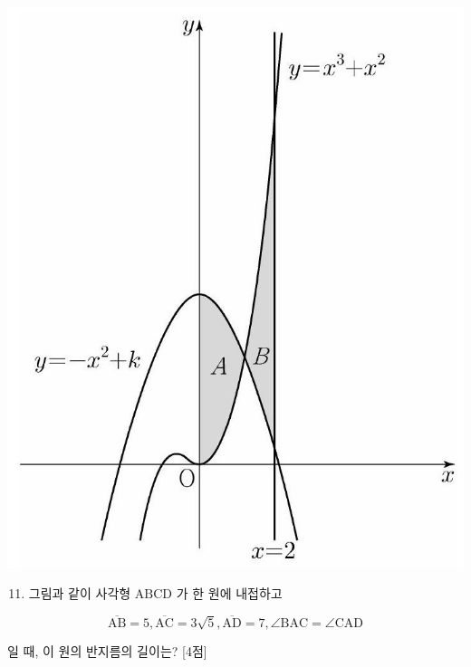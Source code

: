 \documentclass[10pt]{article}
\begin{document}
\begin{center}
\includegraphics[max width=\textwidth]{2023_05_19_a9cef858603f6abf5411g-23}
\end{center}

\begin{enumerate}
  \setcounter{enumi}{10}
  \item 그림과 같이 사각형 $\mathrm{ABCD}$ 가 한 원에 내접하고
\end{enumerate}

$$
\overline{\mathrm{AB}}=5, \overline{\mathrm{AC}}=3 \sqrt{5}, \overline{\mathrm{AD}}=7, \angle \mathrm{BAC}=\angle \mathrm{CAD}
$$

일 때, 이 원의 반지름의 길이는? [4점]
\end{document}
